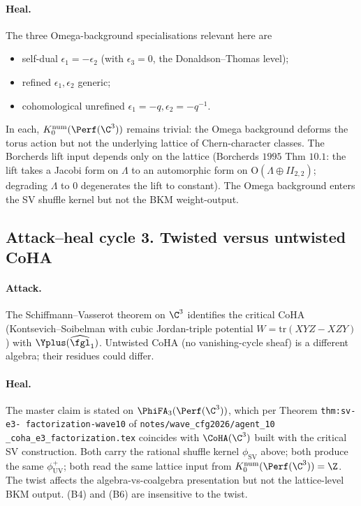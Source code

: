 \paragraph{Heal.} The three Omega-background specialisations
relevant here are
\begin{itemize}
 \item self-dual $\epsilon_1 = -\epsilon_2$ (with $\epsilon_3 = 0$,
 the Donaldson--Thomas level);
 \item refined $\epsilon_1, \epsilon_2$ generic;
 \item cohomological unrefined $\epsilon_1 = -q, \epsilon_2 =
 -q^{-1}$.
\end{itemize}
In each, $K_0^{\mathrm{num}}(\Perf(\C^3))$ remains trivial: the
Omega background deforms the torus action but not the underlying
lattice of Chern-character classes. The Borcherds lift input
depends only on the lattice (Borcherds $1995$ Thm $10.1$: the
lift takes a Jacobi form on $\Lambda$ to an automorphic form on
$\mathrm{O}(\Lambda \oplus II_{2, 2})$; degrading $\Lambda$ to
$0$ degenerates the lift to constant). The Omega background enters
the SV shuffle kernel but not the BKM weight-output.

\subsection*{Attack--heal cycle 3.  Twisted versus untwisted CoHA}

\paragraph{Attack.} The Schiffmann--Vasserot theorem on $\C^3$
identifies the critical CoHA (Kontsevich--Soibelman with cubic
Jordan-triple potential $W = \mathrm{tr}(XYZ - XZY)$) with
$\Yplus(\widehat{\fgl}_1)$. Untwisted CoHA (no vanishing-cycle
sheaf) is a different algebra; their residues could differ.

\paragraph{Heal.} The master claim is stated on
$\PhiFA_3(\Perf(\C^3))$, which per Theorem \texttt{thm:sv-e3-
factorization-wave10} of \texttt{notes/wave\_cfg2026/agent\_10
\_coha\_e3\_factorization.tex} coincides with $\CoHA(\C^3)$
built with the critical SV construction. Both carry the
rational shuffle kernel $\phi_{\mathrm{SV}}$ above; both produce
the same $\phi^+_{\mathrm{UV}}$; both read the same lattice input
from $K_0^{\mathrm{num}}(\Perf(\C^3)) = \Z$. The twist affects the
algebra-vs-coalgebra presentation but not the lattice-level BKM
output. (B4) and (B6) are insensitive to the twist.

